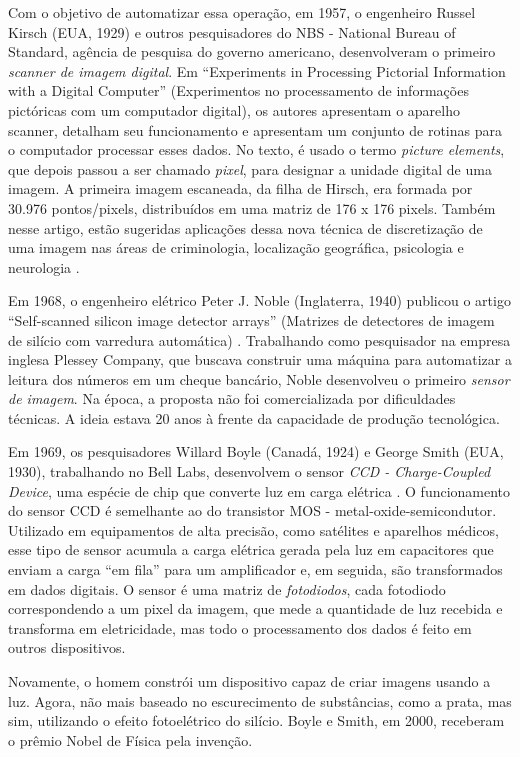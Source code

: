 \documentclass{hipatia}
\begin{document}
Com o objetivo de automatizar essa operação, em 1957, o engenheiro Russel Kirsch (EUA, 1929) e outros pesquisadores do NBS - National Bureau of Standard, agência de pesquisa do governo americano, desenvolveram o primeiro \textit{scanner de imagem digital}. Em ``Experiments in Processing Pictorial Information with a Digital Computer'' (Experimentos no processamento de informações pictóricas com um computador digital), os autores  apresentam o aparelho scanner, detalham seu funcionamento e apresentam um conjunto de rotinas para o computador processar esses dados. No texto, é usado o termo \textit{picture elements}, que depois passou a ser chamado \textit{pixel}, para designar a unidade digital de uma imagem. A primeira imagem escaneada, da filha de Hirsch, era formada por 30.976 pontos/pixels, distribuídos em uma matriz de 176 x 176 pixels. Também nesse artigo, estão sugeridas aplicações dessa nova técnica de discretização de uma imagem nas áreas de criminologia, localização geográfica, psicologia e neurologia \cite{Kirsch1958}.

Em 1968, o engenheiro elétrico Peter J. Noble (Inglaterra, 1940) publicou o artigo ``Self-scanned silicon image detector arrays'' (Matrizes de detectores de imagem de silício com varredura automática) \cite{Noble1968}. Trabalhando como pesquisador na empresa inglesa Plessey Company, que buscava construir uma máquina para automatizar a leitura dos números em um cheque bancário, Noble desenvolveu o primeiro \textit{sensor de imagem}. Na época, a proposta não foi comercializada por dificuldades técnicas. A ideia estava 20 anos à frente da capacidade de produção tecnológica.

Em 1969, os pesquisadores Willard Boyle (Canadá, 1924) e George Smith (EUA, 1930), trabalhando no Bell Labs, desenvolvem o sensor \textit{CCD - Charge-Coupled Device}, uma espécie de chip que converte luz em carga elétrica \cite{Boyle1970}. O funcionamento do sensor CCD é semelhante ao do transistor MOS - metal-oxide-semicondutor. Utilizado em equipamentos de alta precisão, como satélites e aparelhos médicos, esse tipo de sensor acumula a carga elétrica gerada pela luz em capacitores que enviam a carga ``em fila'' para um amplificador e, em seguida, são transformados em dados digitais. O sensor é uma matriz de \textit{fotodiodos}, cada fotodiodo correspondendo a um pixel da imagem, que mede a quantidade de luz recebida e transforma em eletricidade, mas todo o processamento dos dados é feito em outros dispositivos.

Novamente, o homem constrói um dispositivo capaz de criar imagens usando a luz. Agora, não mais baseado no escurecimento de substâncias, como a prata, mas sim, utilizando o efeito fotoelétrico do silício. Boyle e Smith, em 2000, receberam o prêmio Nobel de Física pela invenção.
\end{document}
